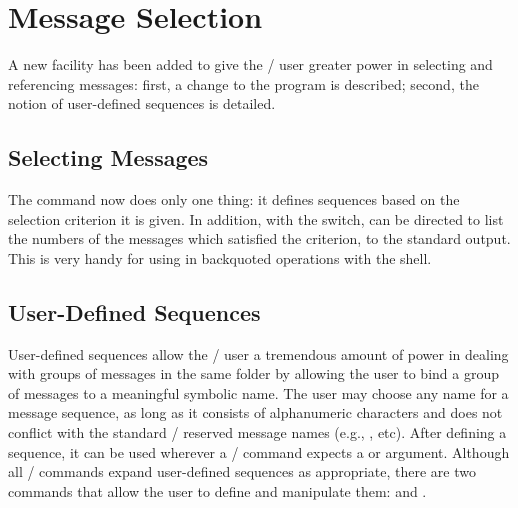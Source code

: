 \section{Message Selection}
A new facility has been added to give the \MH/ user greater power in
selecting and referencing messages:
first, a change to the  program is described;
second, the notion of user-defined sequences is detailed.
\subsection{Selecting Messages}
The  command now does only one thing:
it defines sequences based on the selection criterion it is given.
In addition, with the  switch,
 can be directed to list the numbers of the messages which
satisfied the criterion, to the standard output.
This is very handy for using  in backquoted operations with the
shell.
\subsection{User-Defined Sequences}
User-defined sequences allow the \MH/ user a tremendous amount of power
in dealing with groups of messages in the same folder
by allowing the user to bind a group of messages to a meaningful symbolic
name.
The user may choose any name for a message sequence,
as long as it consists of alphanumeric characters and does not conflict with
the standard \MH/ reserved message names (e.g., , etc).
After defining a sequence,
it can be used wherever a \MH/ command expects a  or 
argument.
Although all \MH/ commands expand user-defined sequences as appropriate,
there are two commands that allow the user to define and manipulate them:
 and .
